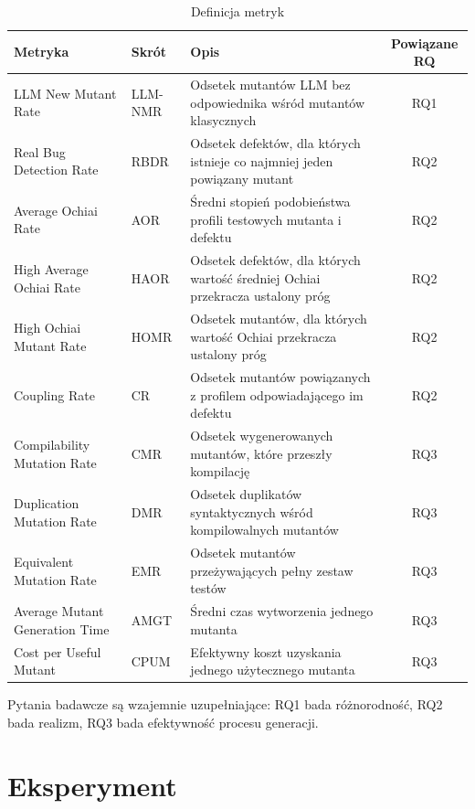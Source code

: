 \documentclass[12pt,a4paper,oldfontcommands]{memoir}
\theoremstyle{plain}
\theoremstyle{definition}
\theoremstyle{remark}
\begin{document}
    \begin{table}[H]
        \centering
        \small
        \begin{tabular}{|l|l|p{5.5cm}|c|}
            \hline
            Metryka & Skrót & Opis & Powiązane RQ \\ \hline
            LLM New Mutant Rate & LLM-NMR & Odsetek mutantów LLM bez odpowiednika wśród mutantów klasycznych & RQ1 \\ \hline
            Real Bug Detection Rate & RBDR & Odsetek defektów, dla których istnieje co najmniej jeden powiązany mutant & RQ2 \\ \hline
            Average Ochiai Rate & AOR & Średni stopień podobieństwa profili testowych mutanta i defektu & RQ2 \\ \hline
            High Average Ochiai Rate & HAOR & Odsetek defektów, dla których wartość średniej Ochiai przekracza ustalony próg & RQ2 \\ \hline
            High Ochiai Mutant Rate & HOMR & Odsetek mutantów, dla których wartość Ochiai przekracza ustalony próg & RQ2 \\ \hline
            Coupling Rate & CR & Odsetek mutantów powiązanych z profilem odpowiadającego im defektu & RQ2 \\ \hline
            Compilability Mutation Rate & CMR & Odsetek wygenerowanych mutantów, które przeszły kompilację & RQ3 \\ \hline
            Duplication Mutation Rate & DMR & Odsetek duplikatów syntaktycznych wśród kompilowalnych mutantów & RQ3 \\ \hline
            Equivalent Mutation Rate & EMR & Odsetek mutantów przeżywających pełny zestaw testów & RQ3 \\ \hline
            Average Mutant Generation Time & AMGT & Średni czas wytworzenia jednego mutanta & RQ3 \\ \hline
            Cost per Useful Mutant & CPUM & Efektywny koszt uzyskania jednego użytecznego mutanta & RQ3 \\ \hline
        \end{tabular}
        \caption{Definicja metryk}
        \label{tab:metryki}
    \end{table}

    Pytania badawcze są wzajemnie uzupełniające: RQ1 bada różnorodność, RQ2 bada realizm, RQ3 bada efektywność procesu generacji.

    \clearpage
    \openany
    \chapter{Eksperyment}
    \openright
\end{document}
